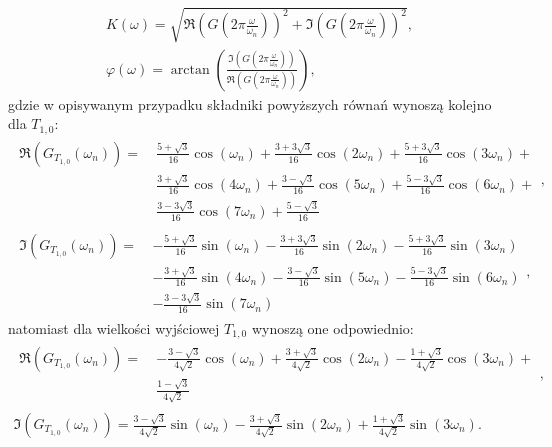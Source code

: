 \begin{gather}
K(\omega) = \sqrt{\Re \left( G \left( 2\pi \frac{\omega}{\omega_{n}} \right) \right)^{2} + \Im \left( G \left( 2\pi \frac{\omega}{\omega_{n}} \right) \right)^{2}} \label{eqn_sym_partd_output_amp_w}, \\
\varphi(\omega) = \arctan \left( \frac{\Im \left( G \left( 2\pi \frac{\omega}{\omega_{n}} \right) \right)}{\Re \left( G \left( 2\pi \frac{\omega}{\omega_{n}} \right) \right)} \right) \label{eqn_sym_partd_output_phi_w},
\end{gather}
gdzie w opisywanym przypadku składniki powyższych równań wynoszą kolejno dla $T_{1,0}$:
\begin{gather}
\begin{split}
\Re \left( G_{T_{1,0}}(\omega_{n}) \right) = ~ 
& \frac{5 + \sqrt{3}}{16} \cos(\omega_{n}) + \frac{3 + 3 \sqrt{3}}{16} \cos(2\omega_{n}) + \frac{5 + 3 \sqrt{3}}{16} \cos(3\omega_{n}) + \\
& \frac{3 + \sqrt{3}}{16} \cos(4\omega_{n}) + \frac{3 - \sqrt{3}}{16} \cos(5\omega_{n}) + \frac{5 - 3 \sqrt{3}}{16} \cos(6\omega_{n}) + \\
& \frac{3 - 3 \sqrt{3}}{16} \cos(7\omega_{n}) + \frac{5 - \sqrt{3}}{16}
\end{split}
\label{eqn_sym_partd_output_trans_wn_re_S_2_0}, \\
\begin{split}
\Im \left( G_{T_{1,0}}(\omega_{n}) \right) = ~ 
& - \frac{5 + \sqrt{3}}{16} \sin(\omega_{n}) - \frac{3 + 3 \sqrt{3}}{16} \sin(2\omega_{n}) - \frac{5 + 3 \sqrt{3}}{16} \sin(3\omega_{n}) \\
& - \frac{3 + \sqrt{3}}{16} \sin(4\omega_{n}) - \frac{3 - \sqrt{3}}{16} \sin(5\omega_{n}) - \frac{5 - 3 \sqrt{3}}{16} \sin(6\omega_{n}) \\
& - \frac{3 - 3 \sqrt{3}}{16} \sin(7\omega_{n})
\end{split}
\label{eqn_sym_partd_output_trans_wn_im_S_2_0},
\end{gather}
natomiast dla wielkości wyjściowej $T_{1,0}$ wynoszą one odpowiednio:
\begin{gather}
\begin{split}
\Re \left( G_{T_{1,0}}(\omega_{n}) \right) = ~ 
& - \frac{3 - \sqrt{3}}{4 \sqrt{2}} \cos(\omega_{n}) + \frac{3 + \sqrt{3}}{4 \sqrt{2}} \cos(2\omega_{n}) - \frac{1 + \sqrt{3}}{4 \sqrt{2}} \cos(3\omega_{n}) + \\
& \frac{1 - \sqrt{3}}{4 \sqrt{2}}
\end{split}
\label{eqn_sym_partd_output_trans_wn_re_T_1_0}, \\
\Im \left( G_{T_{1,0}}(\omega_{n}) \right) = \frac{3 - \sqrt{3}}{4 \sqrt{2}} \sin(\omega_{n}) - \frac{3 + \sqrt{3}}{4 \sqrt{2}} \sin(2\omega_{n}) + \frac{1 + \sqrt{3}}{4 \sqrt{2}} \sin(3\omega_{n})
\label{eqn_sym_partd_output_trans_wn_im_T_1_0}.
\end{gather}


